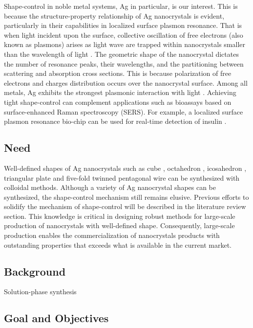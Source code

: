 Shape-control in noble metal systems, Ag in particular, is our interest.
This is because the structure-property relationship of Ag nanocrystals is evident, particularly in their capabilities in localized surface plasmon resonance.
That is when light incident upon the surface, collective oscillation of free electrons (also known as plasmons) arises as light wave are trapped within nanocrystals smaller than the wavelength of light \cite{Petryayeva_2011}.
The geometric shape of the nanocrystal dictates the number of resonance peaks, their wavelengths, and the partitioning between scattering and absorption cross sections.
This is because polarization of free electrons and charges distribution occurs over the nanocrystal surface.
Among all metals, Ag exhibits the strongest plasmonic interaction with light \cite{Lu_2009}.
Achieving tight shape-control can complement applications such as bioassays based on surface-enhanced Raman spectroscopy (SERS).
For example, a localized surface plasmon resonance bio-chip can be used for real-time detection of insulin \cite{Hiep_2008}.

\subsection{Need}

Well-defined shapes of Ag nanocrystals such as cube \cite{Im_2005}, octahedron \cite{Xia_2012}, icosahedron \cite{Xiong_2007}, triangular plate \cite{Lofton_2005} and five-fold twinned pentagonal wire \cite{Tsuji_2008} can be synthesized with colloidal methods.
Although a variety of Ag nanocrystal shapes can be synthesized, the shape-control mechanism still remains elusive.
Previous efforts to solidify the mechanism of shape-control will be described in the literature review section.
This knowledge is critical in designing robust methods for large-scale production of nanocrystals with well-defined shape.
Consequently, large-scale production enables the commercialization of nanocrystals products with outstanding properties that exceeds what is available in the current market.

\subsection{Background}

Solution-phase synthesis

\subsection{Goal and Objectives}

